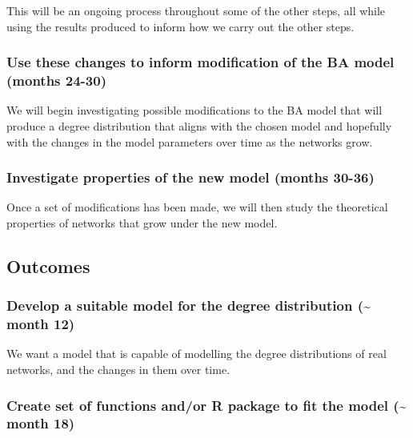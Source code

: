 \documentclass[
]{article}
\begin{document}
This will be an ongoing process throughout some of the other steps, all
while using the results produced to inform how we carry out the other
steps.

\subsubsection*{Use these changes to inform modification of the BA model
(months
24-30)}\label{use-these-changes-to-inform-modification-of-the-ba-model-months-24-30}

We will begin investigating possible modifications to the BA model that
will produce a degree distribution that aligns with the chosen model and
hopefully with the changes in the model parameters over time as the
networks grow.

\subsubsection*{Investigate properties of the new model (months
30-36)}\label{investigate-properties-of-the-new-model-months-30-36}

Once a set of modifications has been made, we will then study the
theoretical properties of networks that grow under the new model.

\subsection{Outcomes}\label{outcomes}

\subsubsection*{Develop a suitable model for the degree distribution
(\textasciitilde{} month
12)}\label{develop-a-suitable-model-for-the-degree-distribution-month-12}

We want a model that is capable of modelling the degree distributions of
real networks, and the changes in them over time.

\subsubsection*{Create set of functions and/or R package to fit the
model (\textasciitilde{} month
18)}\label{create-set-of-functions-andor-r-package-to-fit-the-model-month-18}
\end{document}
